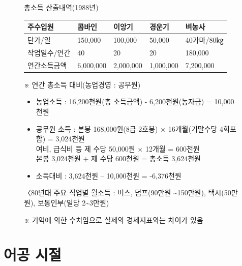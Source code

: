 \documentclass[chapter,book,openany,twoside]{oblivoir}
\begin{document}
\begin{figure}[h]

{ 총소득 산출내역(1988년)

\tabulinesep=1.2mm
\begin{tabu}{|X[1,c]|X[1,c]|X[1,c]|X[1,c]|X[1,c]|}
\hline
주수입원 & 콤바인 & 이앙기 & 경운기 & 벼농사 \\ \hline
단가/일 & 150,000 & 100,000 & 50,000 & 40가마/80㎏ \\ \hline
작업일수/연간 & 40 & 20 & 20 & 180,000 \\ \hline
연간소득금액 & 6,000,000 & 2,000,000 & 1,000,000 & 7,200,000 \\ \hline
\end{tabu}}
※ 연간 총소득 대비(농업경영 : 공무원)
\begin{itemize}
   \item 농업소득 : 16,200천원(총 소득금액) - 6,200천원(농자금) = 10,000천원
   \item 공무원 소득 : 본봉 168,000원(8급 2호봉) × 16개월(기말수당 4회포함) = 3,024천원\\%
                  여비, 급식비 등 제 수당 50,000원 × 12개월 = 600천원 \\%
                  본봉 3,024천원 + 제 수당 600천원 = 총소득 3,624천원
   \item 소득대비 : 3,624천원 – 10,000천원 = -6,376천원
\end{itemize}
〈80년대 주요 직업별 월소득 : 버스, 덤프(90만원 \textasciitilde 150만원), 택시(50만원), 보통인부(일당 2\textasciitilde3만원)%

※ 기억에 의한 수치임으로 실제의 경제지표와는 차이가 있음 
\end{figure}

\chapter{어공 시절}
\end{document}

